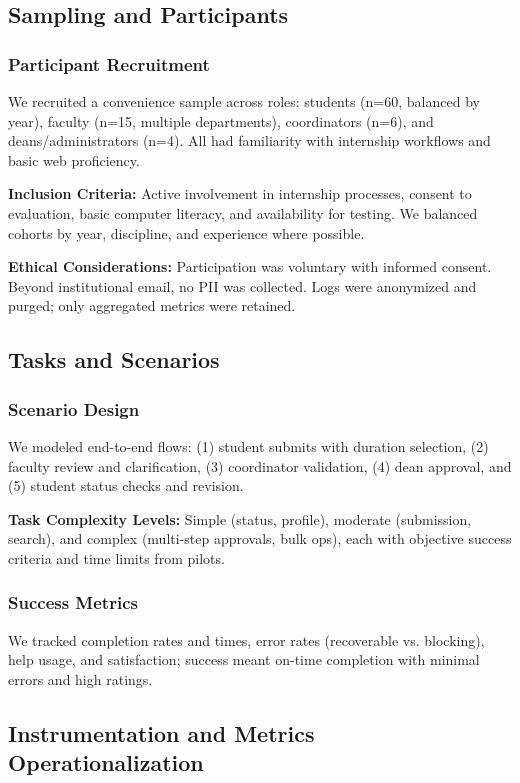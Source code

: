 \documentclass[conference]{IEEEtran}
\begin{document}
\subsection{Sampling and Participants}

\subsubsection{Participant Recruitment}
We recruited a convenience sample across roles: students (n=60, balanced by year), faculty (n=15, multiple departments), coordinators (n=6), and deans/administrators (n=4). All had familiarity with internship workflows and basic web proficiency.

\textbf{Inclusion Criteria:} Active involvement in internship processes, consent to evaluation, basic computer literacy, and availability for testing. We balanced cohorts by year, discipline, and experience where possible.

\textbf{Ethical Considerations:} Participation was voluntary with informed consent. Beyond institutional email, no PII was collected. Logs were anonymized and purged; only aggregated metrics were retained.

\subsection{Tasks and Scenarios}

\subsubsection{Scenario Design}
We modeled end-to-end flows: (1) student submits with duration selection, (2) faculty review and clarification, (3) coordinator validation, (4) dean approval, and (5) student status checks and revision.

\textbf{Task Complexity Levels:} Simple (status, profile), moderate (submission, search), and complex (multi-step approvals, bulk ops), each with objective success criteria and time limits from pilots.

\subsubsection{Success Metrics}
We tracked completion rates and times, error rates (recoverable vs. blocking), help usage, and satisfaction; success meant on-time completion with minimal errors and high ratings.

\subsection{Instrumentation and Metrics Operationalization}
\end{document}
